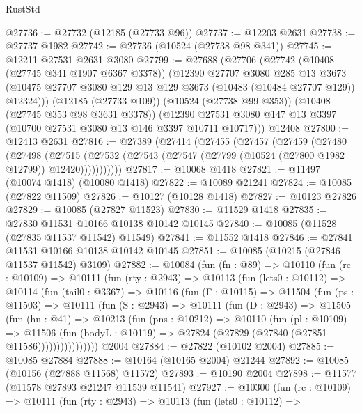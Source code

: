 \begin{lexlean}{RustStd}
\begin{coremodule}
@27736 := @27732 (@12185 (@27733 @96))
@27737 := @12203 @2631
@27738 := @27737 @1982
@27742 := @27736 (@10524 (@27738 @98 @341))
@27745 := @12211 @27531 @2631 @3080
@27799 := @27688
    (@27706
      (@27742
        (@10408 (@27745 @341 @1907 @6367 @3378))
        (@12390
          @27707
          @3080
          @285
          @13
          @3673
          (@10475 @27707 @3080 @129 @13 @129 @3673 (@10483 (@10484 @27707 @129)) @12324)))
      (@12185 (@27733 @109))
      (@10524 (@27738 @99 @353))
      (@10408 (@27745 @353 @98 @3631 @3378))
      (@12390 @27531 @3080 @147 @13 @3397 (@10700 @27531 @3080 @13 @146 @3397 @10711 @10717)))
    @12408
@27800 := @12413 @2631
@27816 := @27389
    (@27414
      (@27455
        (@27457
          (@27459
            (@27480
              (@27498
                (@27515
                  (@27532 (@27543 (@27547 (@27799 (@10524 (@27800 @1982 @12799)) @12420)))))))))))
@27817 := @10068 @1418
@27821 := @11497 (@10074 @1418) (@10080 @1418)
@27822 := @10089 @21241
@27824 := @10085 (@27822 @11509)
@27826 := @10127 (@10128 @1418)
@27827 := @10123 @27826
@27829 := @10085 (@27827 @11523)
@27830 := @11529 @1418
@27835 := @27830 @11531 @10166 @10138 @10142 @10145
@27840 := @10085 (@11528 (@27835 @11537 @11542) @11549)
@27841 := @11552 @1418
@27846 := @27841 @11531 @10166 @10138 @10142 @10145
@27851 := @10085 (@10215 (@27846 @11537 @11542) @3109)
@27882 := @10084
    (fun (fn : @89) =>
    @10110
      (fun (rc : @10109) =>
      @10111
        (fun (rty : @2943) =>
        @10113
          (fun (lets0 : @10112) =>
          @10114
            (fun (tail0 : @3367) =>
            @10116
              (fun (Γ : @10115) =>
              @11504
                (fun (ps : @11503) =>
                @10111
                  (fun (S : @2943) =>
                  @10111
                    (fun (D : @2943) =>
                    @11505
                      (fun (hn : @41) =>
                      @10213
                        (fun (pns : @10212) =>
                        @10110
                          (fun (pl : @10109) =>
                          @11506
                            (fun (bodyL : @10119) =>
                            @27824 (@27829 (@27840 (@27851 @11586))))))))))))))))
    @2004
@27884 := @27822 (@10102 @2004)
@27885 := @10085 @27884
@27888 := @10164 (@10165 @2004) @21244
@27892 := @10085 (@10156 (@27888 @11568) @11572)
@27893 := @10190 @2004
@27898 := @11577 (@11578 @27893 @21247 @11539 @11541)
@27927 := @10300
    (fun (rc : @10109) =>
    @10111
      (fun (rty : @2943) =>
      @10113
        (fun (lets0 : @10112) =>

\end{coremodule}
\end{lexlean}
